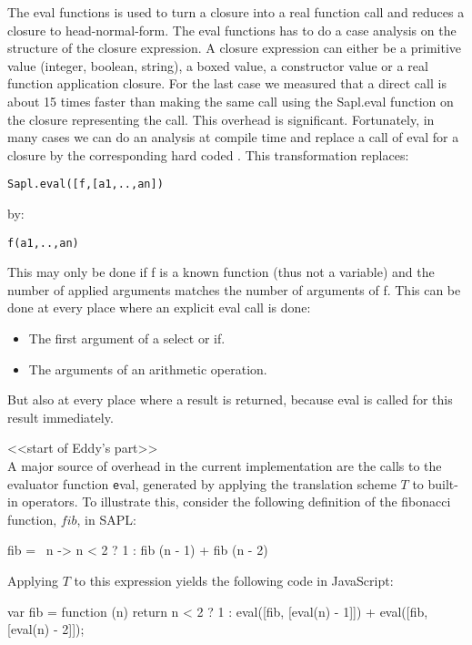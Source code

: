 The \textsf{eval} functions is used to turn a closure into a real \JS function call and reduces a closure to head-normal-form.
The \textsf{eval} functions has to do a case analysis on the structure of the closure expression.
A closure expression can either be a primitive value (integer, boolean, string), a boxed value, a constructor value or a real function application closure.
For the last case we measured that a direct \JS call is about 15 times faster than making the same call using the 
\textsf{Sapl.eval} function on the closure representing the call. This overhead is significant. 
Fortunately, in many cases we can do an analysis at compile time and replace a call of \textsf{eval} for a closure by the corresponding hard coded \JS.
This transformation replaces:
\begin{verbatim}
Sapl.eval([f,[a1,..,an])
\end{verbatim}
by:
\begin{verbatim}
f(a1,..,an)
\end{verbatim}
This may only be done if \textsf{f} is a known function (thus not a variable) and the number of applied arguments matches the
number of arguments of \textsf{f}.
This can be done at every place where an explicit \textsf{eval} call is done:
\begin{itemize}
\item The first argument of a \textsf{select} or \textsf{if}.
\item The arguments of an arithmetic operation.
\end{itemize}
But also at every place where a result is returned, because \textsf{eval} is called for this result immediately.

<<start of Eddy's part>>\\
A major source of overhead in the current implementation are the calls to the
evaluator function {\texttt eval}, generated by applying the translation scheme
$T$ to built-in operators. To illustrate this, consider the following definition
of the fibonacci function, $fib$, in SAPL:

\begin{CleanCode}
fib = \ n -> n < 2 ? 1 : fib (n - 1) + fib (n - 2)
\end{CleanCode}

Applying $T$ to this expression yields the following code in JavaScript:

\begin{CleanCode}
var fib = function (n) {
    return n < 2 ? 1 : eval([fib, [eval(n) - 1]]) + eval([fib, [eval(n) - 2]]);
}
\end{CleanCode}

